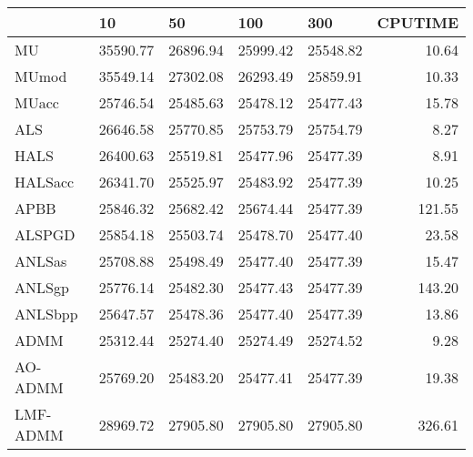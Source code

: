 \documentclass{article}
\begin{document}
\begin{table}[H]
	\centering 
	\begin{tabular}{|l|r|r|r|r|r|}
		\hline
		& \multicolumn{1}{l|}{10} & \multicolumn{1}{l|}{50} & \multicolumn{1}{l|}{100} & \multicolumn{1}{l|}{300} & \multicolumn{1}{l|}{CPUTIME} \\ \hline
		MU       & 35590.77                & 26896.94                & 25999.42                 & 25548.82                 & 10.64                        \\ \hline
		MUmod    & 35549.14                & 27302.08                & 26293.49                 & 25859.91                 & 10.33                        \\ \hline
		MUacc    & 25746.54                & 25485.63                & 25478.12                 & 25477.43                 & 15.78                        \\ \hline
		ALS      & 26646.58                & 25770.85                & 25753.79                 & 25754.79                 & 8.27                         \\ \hline
		HALS     & 26400.63                & 25519.81                & 25477.96                 & 25477.39                 & 8.91                         \\ \hline
		HALSacc  & 26341.70                & 25525.97                & 25483.92                 & 25477.39                 & 10.25                        \\ \hline
		APBB     & 25846.32                & 25682.42                & 25674.44                 & 25477.39                 & 121.55                       \\ \hline
		ALSPGD   & 25854.18                & 25503.74                & 25478.70                 & 25477.40                 & 23.58                        \\ \hline
		ANLSas   & 25708.88                & 25498.49                & 25477.40                 & 25477.39                 & 15.47                        \\ \hline
		ANLSgp   & 25776.14                & 25482.30                & 25477.43                 & 25477.39                 & 143.20                       \\ \hline
		ANLSbpp  & 25647.57                & 25478.36                & 25477.40                 & 25477.39                 & 13.86                        \\ \hline
		ADMM     & 25312.44                & 25274.40                & 25274.49                 & 25274.52                 & 9.28                         \\ \hline
		AO-ADMM  & 25769.20                & 25483.20                & 25477.41                 & 25477.39                 & 19.38                        \\ \hline
		LMF-ADMM & 28969.72                & 27905.80                & 27905.80                 & 27905.80                 & 326.61                       \\ \hline
	\end{tabular}
\end{table}
\end{document}
